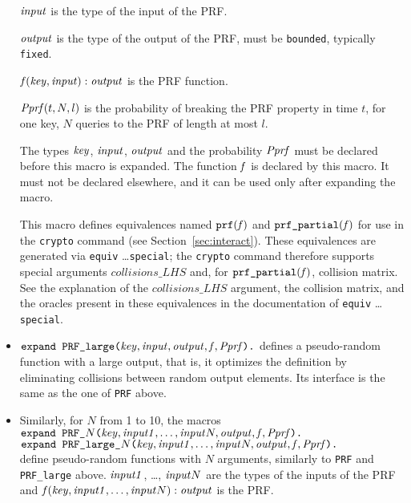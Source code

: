 \documentclass{article}
\begin{document}
\begin{itemize}
   $\mathit{input}$ is the type of the input of the PRF.

   $\mathit{output}$ is the type of the output of the PRF, must be \texttt{bounded}, typically \texttt{fixed}.

   $\mathit{f}(\mathit{key}, \mathit{input}):\mathit{output}$ is the PRF function.

   $\mathit{Pprf}(t, N, l)$ is the probability of breaking the PRF property
   in time $t$, for one key, $N$ queries to the PRF of length at most $l$.

   The types $\mathit{key}$, $\mathit{input}$, $\mathit{output}$
   and the probability $\mathit{Pprf}$ must be declared before this macro
   is expanded. The function $\mathit{f}$ is declared by
   this macro. It must not be declared elsewhere, and it can be
   used only after expanding the macro.

   This macro defines equivalences named $\texttt{prf}(\mathit{f})$ and $\texttt{prf\_partial}(\mathit{f})$
   for use in the \texttt{crypto} command 
   (see Section~\ref{sec:interact}). These equivalences are generated via \texttt{equiv} \dots \texttt{special};
   the \texttt{crypto} command therefore supports special arguments $\mathit{collisions\_LHS}$ and, 
   for $\texttt{prf\_partial}(\mathit{f})$, collision matrix. See the explanation of the $\mathit{collisions\_LHS}$
   argument, the collision matrix, and the oracles present in these equivalences in the documentation of \texttt{equiv} \dots \texttt{special}.

\item $\texttt{expand PRF\_large(}\mathit{key}, \mathit{input}, \mathit{output}, \mathit{f}, \mathit{Pprf}\texttt{).}$ 
defines a pseudo-random function with a large output, that is, it optimizes the 
definition by eliminating collisions between random output elements.
Its interface is the same as the one of \texttt{PRF} above.

 \item Similarly, for $N$ from 1 to 10, the macros\\
$\texttt{expand PRF\_$N$(}\mathit{key}, \mathit{input1}, \dots, \mathit{input}N, \mathit{output}, \mathit{f}, \mathit{Pprf}\texttt{).}$ \\
$\texttt{expand PRF\_large\_$N$(}\mathit{key}, \mathit{input1}, \dots, \mathit{input}N, \mathit{output}, \mathit{f}, \mathit{Pprf}\texttt{).}$ \\
define pseudo-random functions with $N$ arguments, 
similarly to \texttt{PRF} and \texttt{PRF\_large} above.
$\mathit{input1}$, \dots, $\mathit{input}N$ are the types of the inputs of the PRF and
$\mathit{f}(\mathit{key}, \mathit{input1}, \dots, \mathit{input}N):\mathit{output}$ is the PRF.


\end{itemize}
\end{document}
